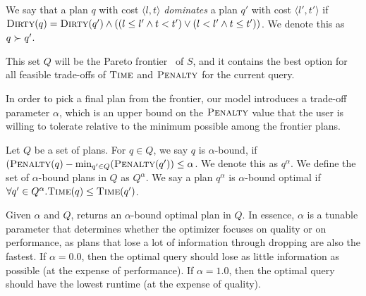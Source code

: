 \begin{definition}
We say that a plan $q$ with cost $\langle l, t \rangle$ \emph{dominates} a plan $q'$ with cost $\langle l', t' \rangle$ if $\textsc{Dirty}(q) = \textsc{Dirty}(q') \land ((l \leq l' \land t < t') \lor (l < l' \land t \leq t'))$. We denote this as $q \succ q'$. 
\end{definition}

This set $Q$ will be the Pareto frontier~\cite{pareto1964cours} of $S$, and it contains the best option for all feasible trade-offs of $\textsc{Time}$ and $\textsc{Penalty}$ for the current query. 

In order to pick a final plan from the frontier, our model introduces a trade-off parameter $\alpha$, which is an upper bound on the $\textsc{Penalty}$ value that the user is willing
to tolerate relative to the minimum possible among the frontier plans.

\begin{definition}
Let $Q$ be a set of plans. For $q \in Q$, we say $q$ is $\alpha$-bound, if $(\textsc{Penalty}(q) - \min_{q' \in Q}(\textsc{Penalty}(q')) \leq \alpha$. We denote this as $q^\alpha$.
We define the set of $\alpha$-bound plans in $Q$ as $Q^\alpha$.
We say a plan $q^\alpha$ is $\alpha$-bound optimal if $\forall q' \in Q^\alpha. \textsc{Time}(q) \leq \textsc{Time}(q')$. 
\end{definition}

Given $\alpha$ and $Q$, \ProjectName{} returns an $\alpha$-bound optimal plan in $Q$. In essence, $\alpha$ is a tunable parameter 
that determines whether the optimizer focuses on quality or on performance, as plans that
lose a lot of information through dropping are also the fastest. 
If $\alpha=0.0$, then the optimal query should lose as little information as possible (at
the expense of performance). If $\alpha = 1.0$, then the optimal query should have the
lowest runtime (at the expense of quality).


